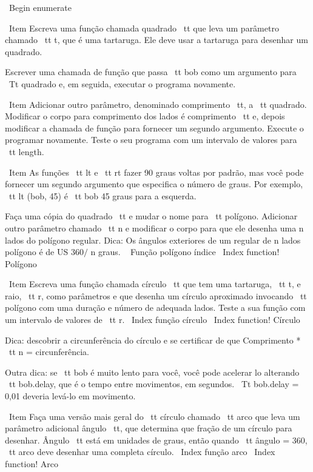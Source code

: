 \documentclass[10pt]{book}
\begin{document}
\begin {itemize}
{\ Begin {enumerate}

\ Item Escreva uma função chamada {quadrado \ tt} que leva um parâmetro
chamado {\ tt t}, que é uma tartaruga. Ele deve usar a tartaruga para desenhar
um quadrado.

Escrever uma chamada de função que passa {\ tt bob} como um argumento para
{\ Tt quadrado} e, em seguida, executar o programa novamente.

\ Item Adicionar outro parâmetro, denominado {comprimento \ tt}, a {\ tt quadrado}.
Modificar o corpo para comprimento dos lados é {comprimento \ tt} e, depois
modificar a chamada de função para fornecer um segundo argumento. Execute o
programar novamente. Teste o seu programa com um intervalo de valores para {\ tt
length}.

\ Item As funções {\ tt lt} e {\ tt rt} fazer 90 graus voltas por
padrão, mas você pode fornecer um segundo argumento que especifica o
número de graus. Por exemplo, {\ tt lt (bob, 45)} é {\ tt bob} 45
graus para a esquerda.

Faça uma cópia do quadrado {\ tt} e mudar o nome para {\ tt polígono}. Adicionar
outro parâmetro chamado {\ tt n} e modificar o corpo para que ele desenha uma
n lados do polígono regular. Dica: Os ângulos exteriores de um regular de n lados
polígono é de US $ 360 / $ n graus.
\ {} Função polígono índice
\ Index {function! Polígono}

\ Item Escreva uma função chamada {círculo \ tt} que tem uma tartaruga, {\ tt t},
e raio, {\ tt r}, como parâmetros e que desenha um círculo aproximado
invocando {\ tt polígono} com uma duração e número de adequada
lados. Teste a sua função com um intervalo de valores de {\ tt r}.
\ Index {função círculo}
\ Index {function! Círculo}

Dica: descobrir a circunferência do círculo e se certificar de que
{Comprimento * \ tt n = circunferência}.

Outra dica: se {\ tt bob} é muito lento para você, você pode acelerar
lo alterando {\ tt bob.delay}, que é o tempo entre movimentos,
em segundos. {\ Tt bob.delay = 0,01} deveria levá-lo em movimento.


\ Item Faça uma versão mais geral do {\ tt círculo} chamado {\ tt arco}
que leva um parâmetro adicional {ângulo \ tt}, que determina
que fração de um círculo para desenhar. {Ângulo \ tt} está em unidades de
graus, então quando {\ tt ângulo = 360}, {\ tt arco} deve desenhar uma completa
círculo.
\ Index {função arco}
\ Index {function! Arco}

}
\end{itemize}
\end{document}
